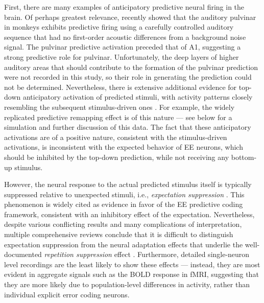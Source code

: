 \documentclass[11pt,twoside]{article}
\newif\myifpdf
\begin{document}
First, there are many examples of anticipatory predictive neural firing in the brain.  Of perhaps greatest relevance, \citet{BarczakOConnellMcGinnisEtAl18} recently showed that the auditory pulvinar in monkeys exhibits predictive firing using a carefully controlled auditory sequence that had no first-order acoustic differences from a background noise signal.  The pulvinar predictive activation preceded that of A1, suggesting a strong predictive role for pulvinar.  Unfortunately, the deep layers of higher auditory areas that should contribute to the formation of the pulvinar prediction were not recorded in this study, so their role in generating the prediction could not be determined.  Nevertheless, there is extensive additional evidence for top-down anticipatory activation of predicted stimuli, with activity patterns closely resembling the subsequent stimulus-driven ones \citep{WalshMcGovernClarkEtAl20}.  For example, the widely replicated predictive remapping effect is of this nature \citep{DuhamelColbyGoldberg92,Wurtz08,CavanaghHuntAfrazEtAl10} --- see below for a simulation and further discussion of this data.  The fact that these anticipatory activations are of a positive nature, consistent with the stimulus-driven activations, is inconsistent with the expected behavior of EE neurons, which should be inhibited by the top-down prediction, while not receiving any bottom-up stimulus.

However, the neural response to the actual predicted stimulus itself is typically suppressed relative to unexpected stimuli, i.e., \emph{expectation suppression} \citep{SummerfieldTrittschuhMontiEtAl08,TodorovicEdeMarisEtAl11,MeyerOlson11,BastosUsreyAdamsEtAl12}.  This phenomenon is widely cited as evidence in favor of the EE predictive coding framework, consistent with an inhibitory effect of the expectation.  Nevertheless, despite various conflicting results and many complications of interpretation, multiple comprehensive reviews conclude that it is difficult to distinguish expectation suppression from the neural adaptation effects that underlie the well-documented \emph{repetition suppression} effect \citep{WalshMcGovernClarkEtAl20,VinkenVogels17,KokLange15,KokJeheedeLange12,SummerfieldEgner09,LeeMumford03}.  Furthermore, detailed single-neuron level recordings are the least likely to show these effects --- instead, they are most evident in aggregate signals such as the BOLD response in fMRI, suggesting that they are more likely due to population-level differences in activity, rather than individual explicit error coding neurons.
\end{document}
